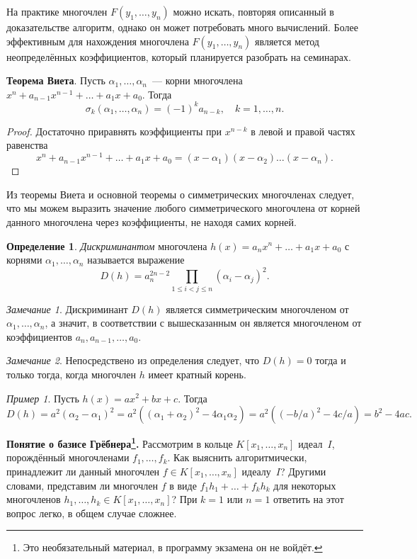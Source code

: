\documentclass[a4paper,10pt]{amsart}
\theoremstyle{definition}
\newtheorem{definition}{Определение}
\theoremstyle{remark}
\newtheorem{remark}{Замечание}
\newtheorem{example}{Пример}
\begin{document}
На практике многочлен $F(y_1, \ldots, y_n)$ можно искать, повторяя
описанный в доказательстве алгоритм, однако он может потребовать
много вычислений. Более эффективным для нахождения многочлена
$F(y_1, \ldots, y_n)$ является метод неопределённых коэффициентов,
который планируется разобрать на семинарах.

{\bf Теорема Виета}. Пусть $\alpha_1,\ldots,\alpha_n$~--- корни
многочлена $x^n + a_{n-1}x^{n-1} + \dots + a_1x + a_0$. Тогда
$$
\sigma_k(\alpha_1,\ldots,\alpha_n)=(-1)^k a_{n-k}, \quad k = 1,
\ldots, n.
$$

\begin{proof}
Достаточно приравнять коэффициенты при $x^{n-k}$ в левой и правой
частях равенства
$$
x^n+a_{n-1}x^{n-1}+\dots+a_1x+a_0=(x-\alpha_1)(x-\alpha_2)\ldots
(x-\alpha_n).
$$
\end{proof}

Из теоремы Виета и основной теоремы о симметрических многочленах
следует, что мы можем выразить значение любого симметрического
многочлена от корней данного многочлена через коэффициенты, не
находя самих корней.

\begin{definition}
{\it Дискриминантом} многочлена $h(x)=a_nx^n+\ldots+a_1x+a_0$ с
корнями $\alpha_1, \ldots, \alpha_n$ называется выражение
$$
D(h) = a_n^{2n-2} \prod \limits_{1 \leqslant i < j \leqslant n}
(\alpha_i - \alpha_j)^2.
$$
\end{definition}

\begin{remark}
Дискриминант $D(h)$ является симметрическим многочленом от
$\alpha_1, \ldots, \alpha_n$, а значит, в соответствии с
вышесказанным он является многочленом от коэффициентов $a_n,
a_{n-1}, \ldots, a_0$.
\end{remark}

\begin{remark}
Непосредствено из определения следует, что $D(h) = 0$ тогда и только
тогда, когда многочлен $h$ имеет кратный корень.
\end{remark}

\begin{example}
Пусть $h(x)=ax^2+bx+c$. Тогда
$$
D(h)=a^2(\alpha_2-\alpha_1)^2=a^2((\alpha_1+\alpha_2)^2-4\alpha_1\alpha_2)=
a^2((-b/a)^2-4c/a)=b^2-4ac.
$$
\end{example}

\bigskip

\textbf{Понятие о базисе Грёбнера\footnote{Это необязательный
материал, в программу экзамена он не войдёт.}.} Рассмотрим в кольце
$K[x_1, \ldots, x_n]$ идеал~$I$, порождённый многочленами $f_1,
\ldots, f_k$. Как выяснить алгоритмически, принадлежит ли данный
многочлен $f \in K[x_1, \ldots, x_n]$ идеалу~$I$? Другими словами,
представим ли многочлен $f$ в виде $f_1h_1+\ldots+f_kh_k$ для
некоторых многочленов $h_1, \ldots, h_k \in K[x_1, \ldots, x_n]$?
При $k=1$ или $n=1$ ответить на этот вопрос легко, в общем случае
сложнее.
\end{document}
